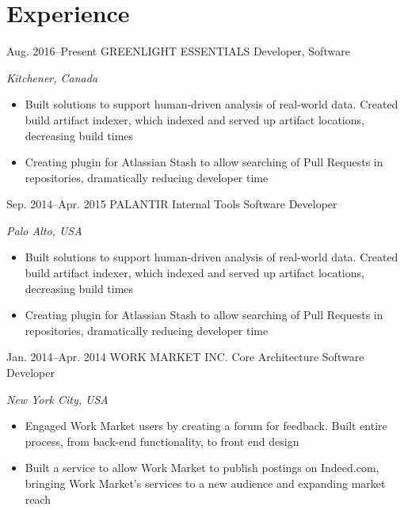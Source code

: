 \documentclass{friggeri-cv}
\begin{document}


\section{Experience}

\begin{sectionlist}
	\entry
	{Aug. 2016--Present}
	{GREENLIGHT ESSENTIALS}
	{Developer, Software}
	{\emph {Kitchener, Canada}\\
		\begin{itemize}
			\item Built solutions to support human-driven analysis of real-world data. Created build artifact indexer, which indexed and served up artifact locations, decreasing build times
			\item Creating plugin for Atlassian Stash to allow searching of Pull Requests in repositories, dramatically reducing developer time
		\end{itemize}
	}
	\entry
	{Sep. 2014--Apr. 2015}
	{PALANTIR}
	{Internal Tools Software Developer}
	{\emph {Palo Alto, USA} \\
		\begin{itemize}
			\item Built solutions to support human-driven analysis of real-world data. Created build artifact indexer, which indexed and served up artifact locations, decreasing build times
			\item Creating plugin for Atlassian Stash to allow searching of Pull Requests in repositories, dramatically reducing developer time
		\end{itemize}
	}
	
	\entry
	{Jan. 2014--Apr. 2014}
	{WORK MARKET INC.}
	{Core Architecture Software Developer }
	{\emph {New York City, USA}\\
		\begin{itemize}
			\item Engaged Work Market users by creating a forum for feedback. Built entire process, from back-end functionality, to front end design
			\item Built a service to allow Work Market to publish postings on Indeed.com, bringing Work Market's services to a new audience and expanding market reach
		\end{itemize}
	}
	

\end{sectionlist}
\end{document}

